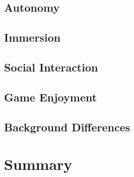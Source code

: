 \subsection{Autonomy}
\subsection{Immersion}
\subsection{Social Interaction}
\subsection{Game Enjoyment}
\subsection{Background Differences}

\section{Summary}
